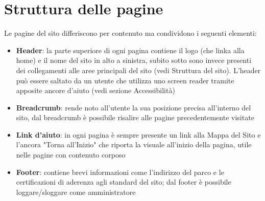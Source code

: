 \documentclass[12pt]{article}
\begin{document}
\newpage

\section{Struttura delle pagine}
Le pagine del sito differiscono per contenuto ma condividono i seguenti elementi:
\begin{itemize}
\item \textbf{Header}: la parte superiore di ogni pagina contiene il logo (che linka alla home) e il nome del sito in alto a sinistra, subito sotto sono invece presenti dei collegamenti alle aree principali del sito (vedi Struttura del sito). L'header pu\`o essere saltato da un utente che utilizza uno screen reader tramite apposite ancore d'aiuto (vedi sezione Accessibilit\`a)
\item \textbf{Breadcrumb}: rende noto all'utente la sua posizione precisa all'interno del sito, dal breadcrumb \`e possibile risalire alle pagine precedentemente visitate
\item \textbf{Link d'aiuto}: in ogni pagina \`e sempre presente un link alla Mappa del Sito e l'ancora "Torna all'Inizio" che riporta la visuale all'inizio della pagina, utile nelle pagine con contenuto corposo
\item \textbf{Footer}: contiene brevi informazioni come l'indirizzo del parco e le certificazioni di aderenza agli standard del sito; dal footer \`e possibile loggare/sloggare come amministratore
\end{itemize}

\newpage
\end{document}
